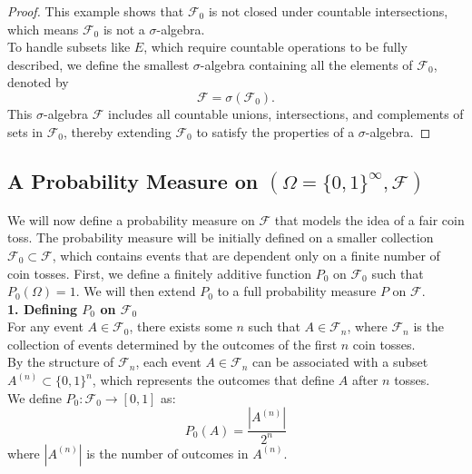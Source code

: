 \begin{proof}
This example shows that \( \mathcal{F}_0 \) is not closed under countable intersections, which means \( \mathcal{F}_0 \) is not a $\sigma$-algebra.\\

To handle subsets like \( E \), which require countable operations to be fully described, we define the smallest $\sigma$-algebra containing all the elements of \( \mathcal{F}_0 \), denoted by
\[
\mathcal{F} = \sigma(\mathcal{F}_0).
\]
This $\sigma$-algebra \( \mathcal{F} \) includes all countable unions, intersections, and complements of sets in \( \mathcal{F}_0 \), thereby extending \( \mathcal{F}_0 \) to satisfy the properties of a $\sigma$-algebra.

\end{proof}

\subsection{A Probability Measure on \( (\Omega = \{0, 1\}^\infty, \mathcal{F}) \)}

We will now define a probability measure on \( \mathcal{F} \) that models the idea of a fair coin toss. The probability measure will be initially defined on a smaller collection \( \mathcal{F}_0 \subset \mathcal{F} \), which contains events that are dependent only on a finite number of coin tosses. First, we define a finitely additive function \( P_0 \) on \( \mathcal{F}_0 \) such that \( P_0(\Omega) = 1 \). We will then extend \( P_0 \) to a full probability measure \( P \) on \( \mathcal{F} \).\\

\textbf{1. Defining \( P_0 \) on \( \mathcal{F}_0 \)}\\

For any event \( A \in \mathcal{F}_0 \), there exists some \( n \) such that \( A \in \mathcal{F}_n \), where \( \mathcal{F}_n \) is the collection of events determined by the outcomes of the first \( n \) coin tosses.\\

By the structure of \( \mathcal{F}_n \), each event \( A \in \mathcal{F}_n \) can be associated with a subset \( A^{(n)} \subset \{0, 1\}^n \), which represents the outcomes that define \( A \) after \( n \) tosses.\\

We define \( P_0: \mathcal{F}_0 \to [0, 1] \) as:
    \[
    P_0(A) = \frac{|A^{(n)}|}{2^n}
    \]
where \( |A^{(n)}| \) is the number of outcomes in \( A^{(n)} \).\\

